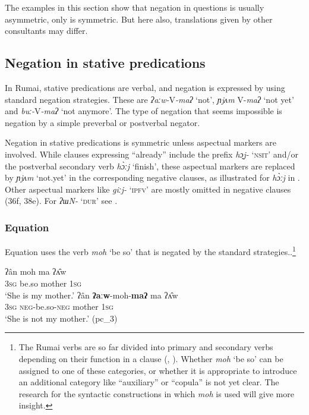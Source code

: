 \documentclass[output=paper,colorlinks,citecolor=brown]{langscibook}
\begin{document}
The examples in this section show that negation in questions is usually asymmetric, only  is symmetric. But here also, translations given by other consultants may differ.

\subsection{Negation in stative predications} \label{sec:rum:2.3}

In Rumai, stative predications are verbal, and negation is expressed by using standard negation strategies. These are \textit{ʔaːw-}V\textit{{}-maʔ} ‘not’, \textit{ɲjʌm} V-\textit{maʔ} ‘not yet’ and \textit{buː{}-}V\textit{{}-maʔ} ‘not anymore’. The type of negation that seems impossible is negation by a simple preverbal or postverbal negator. 

Negation in stative predications is symmetric unless aspectual markers are involved. While clauses expressing “already” include the prefix \textit{hɔ̰j-} ‘\textsc{nsit}’ and/or the postverbal secondary verb \textit{hɔ̀ːj} ‘finish’, these aspectual markers are replaced by \textit{ɲjʌm} ‘not.yet’ in the corresponding negative clauses, as illustrated for \textit{hɔ̀ːj} in . Other aspectual markers like \textit{giːj-} ‘\textsc{ipfv}’ are mostly omitted in negative clauses (36f, 38e). For \textit{ʔɯN-} ‘\textsc{dur}’ see .

\subsubsection{Equation} \label{sec:rum:2.3.1}

Equation uses the verb \textit{moh} ‘be so’ that is negated by the standard strategies..\footnote{The Rumai verbs are so far divided into primary and secondary verbs depending on their function in a clause (, ). Whether \textit{moh} ‘be so’ can be assigned to one of these categories, or whether it is appropriate to introduce an additional category like “auxiliary” or “copula” is not yet clear. The research for the syntactic constructions in which \textit{moh} is used will give more insight.}

\ea\label{ex:rum:35}
    \ea\label{ex:rum:35a}
        \gll ʔân	moh	ma	ʔʌ̂w \\ 
             3\textsc{sg} be.so mother 1\textsc{sg} \\
        \glt ‘She is my mother.’
    \ex\label{ex:rum:35b}
        \gll ʔân	\textbf{ʔaːw}-moh-\textbf{maʔ}	ma	ʔʌ̂w \\
             3\textsc{sg} \textsc{neg}{}-be.so-\textsc{neg} mother 1\textsc{sg} \\
        \glt ‘She is not my mother.’ (pc\_3)
    \z
\z 
\end{document}
